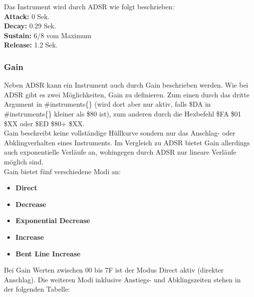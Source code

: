 \bigskip

Das Instrument wird durch ADSR wie folgt beschrieben: \\
\textbf{Attack:} 0 Sek. \\
\textbf{Decay:} 0.29 Sek. \\
\textbf{Sustain:} 6/8 vom Maximum \\
\textbf{Release:} 1.2 Sek.



\subsubsection{Gain}

Neben ADSR kann ein Instrument auch durch Gain beschrieben werden. Wie bei ADSR gibt es zwei Möglichkeiten, Gain zu definieren. Zum einen durch das dritte Argument in \#instruments\{\} (wird dort aber nur aktiv, falls \$DA in \#instruments\{\} kleiner als \$80 ist), zum anderen durch die Hexbefehl \$FA \$01 \$XX oder \$ED \$80+ \$XX. \\
Gain beschreibt keine vollständige Hüllkurve sondern nur das Anschlag- oder Abklingverhalten eines Instruments. Im Vergleich zu ADSR bietet Gain allerdings auch exponentielle Verläufe an, wohingegen durch ADSR nur lineare Verläufe möglich sind. \\
Gain bietet fünf verschiedene Modi an:

\medskip

\begin{itemize}
	\item \textbf{Direct}
	\item \textbf{Decrease}
	\item \textbf{Exponential Decrease}
	\item \textbf{Increase}
	\item \textbf{Bent Line Increase}
\end{itemize}


\bigskip

Bei Gain Werten zwischen 00 bis 7F ist der Modus Direct aktiv (direkter Anschlag).
Die weiteren Modi inklusive Anstiegs- und Abklingszeiten stehen in der folgenden Tabelle:

\bigskip

